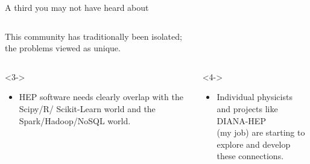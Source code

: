 \documentclass[aspectratio=169]{beamer}
\begin{document}
\begin{frame}{A third you may not have heard about}
\begin{columns}
\vspace{0.2 cm}
\hfill {}
\vspace{-0.2 cm}
\end{columns}
\end{frame}

\begin{frame}{}
\begin{center}
\Large This community has traditionally been isolated; \\
the problems viewed as unique.

\vspace{0.5 cm}
\end{center}

\begin{columns}
\begin{uncoverenv}<3->
\begin{itemize}
\item HEP software needs clearly overlap with the Scipy/R/ Scikit-Learn world and the Spark/Hadoop/NoSQL world. \\ \mbox{ }
\end{itemize}
\end{uncoverenv}

\begin{uncoverenv}<4->
\begin{itemize}
\item Individual physicists and projects like DIANA-HEP \\ (my job) are starting to explore and develop these connections.
\end{itemize}
\end{uncoverenv}

\end{columns}
\vspace{-1.5 cm}
\end{frame}
\end{document}
